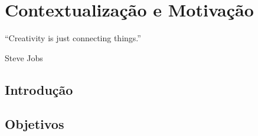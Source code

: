 \chapter{Contextualização e Motivação}


\begin{flushright}
	\begin{quotebox50}
		\large
		“Creativity is just connecting things.”

		\tcblower
		Steve Jobs
	\end{quotebox50}
\end{flushright}


\section{Introdução}

\section{Objetivos}

